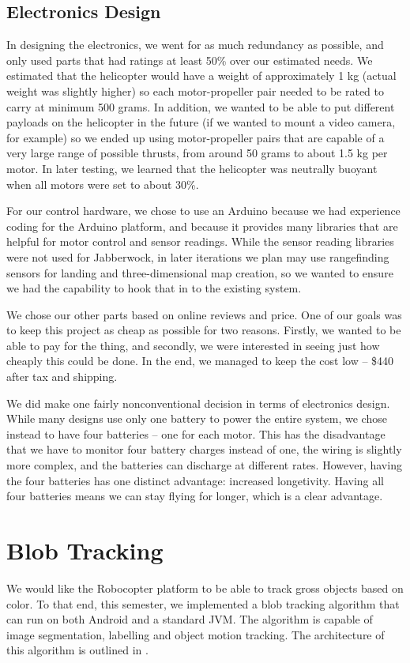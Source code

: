 \subsection{Electronics Design}
In designing the electronics, we went for as much redundancy as
possible, and only used parts that had ratings at least 50\% over our
estimated needs. We estimated that the helicopter would have a weight
of approximately 1 kg (actual weight was slightly higher) so each
motor-propeller pair needed to be rated to
carry at minimum 500 grams. In addition, we wanted to be able to put
different payloads on the helicopter in the future (if we wanted to
mount a video camera, for example) so we ended up using
motor-propeller pairs that are capable of a very large range of
possible thrusts, from around 50 grams to about 1.5 kg per motor. In
later testing, we learned that the helicopter was neutrally buoyant
when all motors were set to about 30\%.

For our control hardware, we chose to use an Arduino because we had
experience coding for the Arduino platform, and because it provides many
libraries that are helpful for motor control and sensor
readings. While the sensor reading libraries were not used for
Jabberwock, in later iterations we plan may use rangefinding sensors
for landing and three-dimensional map creation, so we wanted to ensure
we had the capability to hook that in to the existing system.

We chose our other parts based on online reviews and price. One of our
goals was to keep this project as cheap as possible for two reasons.
Firstly, we wanted to be able to pay for the thing, and secondly, we
were interested in seeing just how cheaply this could be done. In the
end, we managed to keep the cost low -- \$440 after tax and shipping.

We did make one fairly nonconventional decision in terms of
electronics design. While many designs use only one battery to power
the entire system, we chose instead to have four batteries -- one for
each motor. This has the disadvantage that we have to monitor four
battery charges instead of one, the wiring is slightly more complex,
and the batteries can discharge at different rates. However, having
the four batteries has one distinct advantage: increased
longetivity. Having all four batteries means we can stay flying for
longer, which is a clear advantage.

\section{Blob Tracking}
We would like the Robocopter platform to be able to track gross
objects based on color. To that end, this semester, we implemented a
blob tracking algorithm that can run on both Android and a standard
JVM. The algorithm is capable of image segmentation, labelling and
object motion tracking. The architecture of this algorithm is outlined
in .

